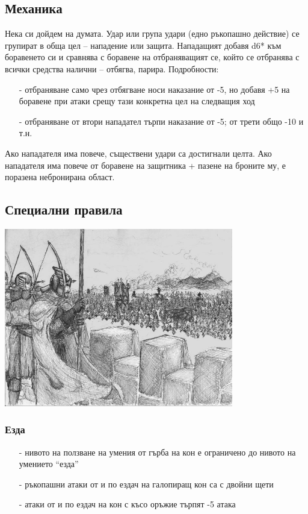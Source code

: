 \subsection{Механика}
Нека си дойдем на думата.
Удар или група удари (едно ръкопашно действие) се групират в обща цел – нападение или защита.
Нападащият добавя d6* към боравенето си и сравнява с боравене на отбраняващият се, който се отбранява с всички средства налични – отбягва, парира.
Подробности:
\begin{itemize}
\item[-]{отбраняване само чрез отбягване носи наказание от -5, но добавя +5 на боравене при атаки срещу тази конкретна цел на следващия ход}
\item[-]{отбраняване от втори нападател търпи наказание от -5; от трети общо -10 и т.н.}
\end{itemize}

Ако нападателя има повече, съществени удари са достигнали целта.
Ако нападателя има повече от боравене на защитника + пазене на броните му, е поразена небронирана област.

\subsection{Специални правила}
\begin{center}
\includegraphics[width=0.75\textwidth]{../images/siege}~
\\[1cm]
\end{center}

\subsubsection{Езда}
\begin{itemize}
\item[-]{нивото на ползване на умения от гърба на кон е ограничено до нивото на умението “езда”}
\item[-]{ръкопашни атаки от и по ездач на галопиращ кон са с двойни щети}
\item[-]{атаки от и по ездач на кон с късо оръжие търпят -5 атака}
\end{itemize}

